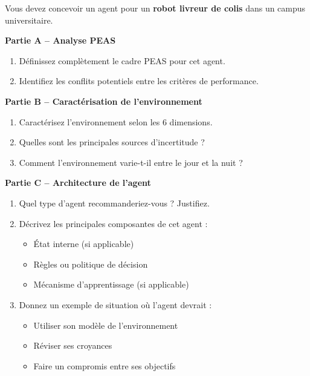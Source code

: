 \documentclass[11pt,a4paper]{article}
\begin{document}
\begin{exercicebox}[Énoncé]
Vous devez concevoir un agent pour un \textbf{robot livreur de colis} dans un campus universitaire.

\textbf{Partie A -- Analyse PEAS}
\begin{enumerate}
    \item Définissez complètement le cadre PEAS pour cet agent.
    \item Identifiez les conflits potentiels entre les critères de performance.
\end{enumerate}

\textbf{Partie B -- Caractérisation de l'environnement}
\begin{enumerate}
    \item Caractérisez l'environnement selon les 6 dimensions.
    \item Quelles sont les principales sources d'incertitude ?
    \item Comment l'environnement varie-t-il entre le jour et la nuit ?
\end{enumerate}

\textbf{Partie C -- Architecture de l'agent}
\begin{enumerate}
    \item Quel type d'agent recommanderiez-vous ? Justifiez.
    \item Décrivez les principales composantes de cet agent :
    \begin{itemize}
        \item État interne (si applicable)
        \item Règles ou politique de décision
        \item Mécanisme d'apprentissage (si applicable)
    \end{itemize}
    \item Donnez un exemple de situation où l'agent devrait :
    \begin{itemize}
        \item Utiliser son modèle de l'environnement
        \item Réviser ses croyances
        \item Faire un compromis entre ses objectifs
    \end{itemize}
\end{enumerate}
\end{exercicebox}
\end{document}
